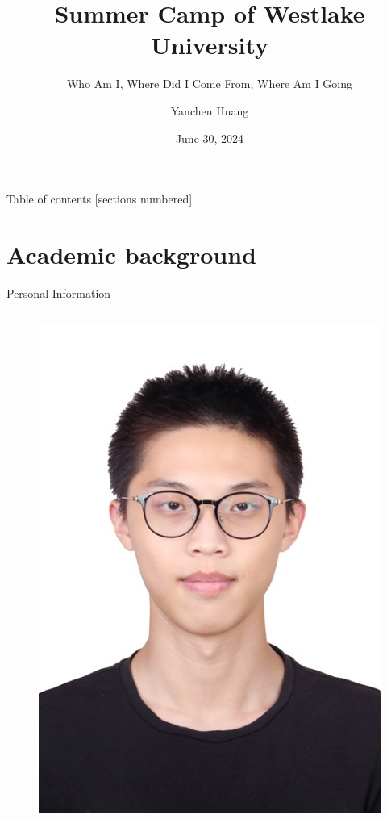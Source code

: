 \documentclass[10pt]{beamer}
\title{Summer Camp of Westlake University}
\subtitle{Who Am I, Where Did I Come From, Where Am I Going}
\date{June 30, 2024}
\author{Yanchen Huang}
\institute{Nanjing University Software Institute}
\begin{document}
\maketitle

\begin{frame}{Table of contents}
  [sections numbered]
  \tableofcontents[hideallsubsections]
\end{frame}

\section{Academic background}

\begin{frame}[fragile]{Personal Information}
    \begin{columns}
            \begin{figure}
            \centering
            \includegraphics[width=\textwidth]{pic/photo_2_resize.jpg}

\end{figure}
\end{columns}
\end{frame}
\end{document}
